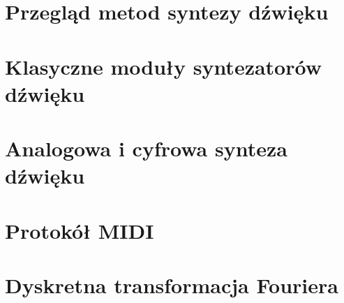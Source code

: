 \section{Przegląd metod syntezy dźwięku}

\section{Klasyczne moduły syntezatorów dźwięku}

\section{Analogowa i cyfrowa synteza dźwięku}

\section{Protokół MIDI}

\section{Dyskretna transformacja Fouriera}

